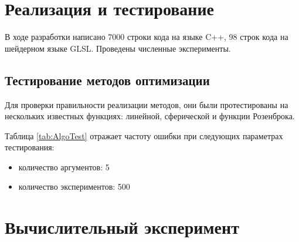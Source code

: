 \chapter{Реализация и тестирование}
\noindent\indent В ходе разработки написано 7000 строки кода на языке C++,
98 строк кода на шейдерном языке GLSL. Проведены численные эксперименты.
\section{Тестирование методов оптимизации}
\noindent Для проверки правильности реализации методов, они были протестированы на
нескольких известных функциях: линейной, сферической и функции Розенброка.\par
    Таблица \ref{tab:AlgoTest} отражает частоту ошибки при следующих параметрах
тестирования:
\begin{itemize}
    \item количество аргументов: 5
    \item количество экспериментов: 500
\end{itemize}
\begin{table}[ht]
\centering
{}
\caption{Результаты тестирования алгоритмов оптимизации}
\label{tab:AlgoTest}
\end{table}\par
\chapter{Вычислительный эксперимент}
